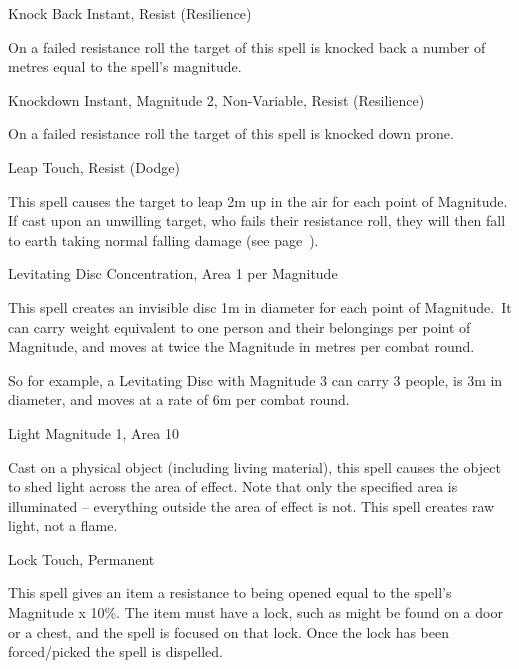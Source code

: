 \begin{rpg-spell}
{Knock Back}
{Instant, Resist (Resilience)}

On a failed resistance roll the target of this spell is knocked back a number of metres equal to the spell’s magnitude.
\end{rpg-spell}


\begin{rpg-spell}
{Knockdown}
{Instant, Magnitude 2, Non-Variable, Resist (Resilience)}

On a failed resistance roll the target of this spell is knocked down prone.
\end{rpg-spell}


\begin{rpg-spell}
{Leap}
{Touch, Resist (Dodge)}

This spell causes the target to leap 2m up in the air for each point of Magnitude. If cast upon an unwilling target, who fails their resistance roll, they will then fall to earth taking normal falling damage (see page~\pageref{ssec:falling}).
\end{rpg-spell}


\begin{rpg-spell}
{Levitating Disc}
{Concentration, Area 1 per Magnitude}

This spell creates an invisible disc 1m in diameter for each point of Magnitude. It can carry weight equivalent to one person and their belongings per point of Magnitude, and moves at twice the Magnitude in metres per combat round.

So for example, a Levitating Disc with Magnitude 3 can carry 3 people, is 3m in diameter, and moves at a rate of 6m per combat round.
\end{rpg-spell}


\begin{rpg-spell}
{Light}
{Magnitude 1, Area 10}

Cast on a physical object (including living material), this spell causes the object to shed light across the area of effect. Note that only the specified area is illuminated – everything outside the area of effect is not. This spell creates raw light, not a flame.
\end{rpg-spell}


\begin{rpg-spell}
{Lock}
{Touch, Permanent}

This spell gives an item a resistance to being opened equal to the spell’s Magnitude x 10\%. The item must have a lock, such as might be found on a door or a chest, and the spell is focused on that lock. Once the lock has been forced/picked the spell is dispelled.
\end{rpg-spell}


